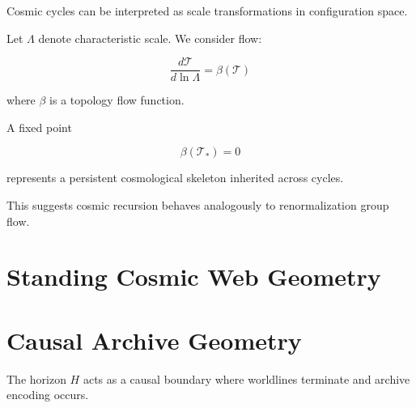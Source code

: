 \documentclass[12pt]{article}
\begin{document}
Cosmic cycles can be interpreted as scale transformations in configuration space.

Let $\Lambda$ denote characteristic scale.
We consider flow:

\[
\frac{d\mathcal{T}}{d\ln \Lambda} = \beta(\mathcal{T})
\]

where $\beta$ is a topology flow function.

A fixed point

\[
\beta(\mathcal{T}_*) = 0
\]

represents a persistent cosmological skeleton inherited across cycles.

This suggests cosmic recursion behaves analogously to renormalization group flow.

\section{Standing Cosmic Web Geometry}

\begin{center}
\end{center}

\section{Causal Archive Geometry}

\begin{center}
\end{center}

The horizon $H$ acts as a causal boundary where worldlines terminate and archive encoding occurs.
\end{document}
